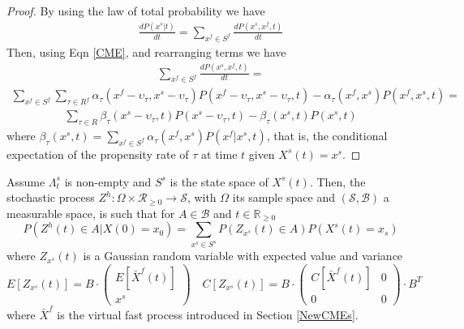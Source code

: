 \documentclass{llncs}
\begin{document}
 \begin{proof}
 By using the law of total probability we have
 \begin{align*}
\frac{d P(x^s|t)}{dt}=\sum_{x^f \in S^f}\frac{d P(x^s,x^f,t)}{dt}
\end{align*}
Then, using Eqn \eqref{CME}, and rearranging terms we have
\begin{align*}
    \sum_{x^f \in S^f}\frac{d P(x^s,x^f,t)}{dt}=
\end{align*}
\begin{align*}
 \sum_{x^f \in S^f}\sum_{\tau \in R^f}\alpha_{\tau}(x^f-\upsilon_{\tau},x^s-\upsilon_{\tau})P(x^f-\upsilon_{\tau},x^s-\upsilon_{\tau},t)- \alpha_{\tau}(x^f,x^s)P(x^f,x^s,t)= 
\end{align*}
\begin{align*}
\sum_{\tau \in R}\beta_{\tau}(x^s-\upsilon_{\tau},t)P(x^s-\upsilon_{\tau},t)- \beta_{\tau}(x^s,t)P(x^s,t)
\end{align*}
where $\beta_{\tau}(x^s,t)= \sum_{x^f \in S^f} \alpha_{\tau}(x^f,x^s)P(x^f|x^s,t)$, that is, the conditional expectation of the propensity rate of $\tau$ at time $t$ given $X^s(t)=x^s$.
 \end{proof}
\begin{theorem}
Assume $\Lambda^s_t$ is non-empty and $S^s$ is the state space of $X^s(t)$.
Then, the stochastic process $Z^h:\Omega \times \mathcal{R}_{\geq 0}\rightarrow \mathcal{S}$, with $\Omega$ its sample space and $(\mathcal{S},\mathcal{B})$ a measurable space, is such that for $A\in \mathcal{B}$ and $t\in \mathbb{R}_{\geq 0}$ 
\begin{equation*}
P(Z^h(t)\in A|X(0)=x_0)=\sum_{x^s \in S^s} P(Z_{x^s}(t)\in A)P(X^s(t)=x_s)
\end{equation*}
where $Z_{x^s}(t)$ is a Gaussian random variable with expected value and variance 
\begin{equation*}
E[Z_{x^s}(t)]=B\cdot
\begin{pmatrix}
E[\bar{X}^f(t)]\\
x^s
\end{pmatrix}
\quad
C[Z_{x^s}(t)]=B\cdot
\begin{pmatrix}
C[\bar{X}^f(t)]&0\\
0&0
\end{pmatrix}
\cdot B^T
\end{equation*}
where $\bar{X}^f$ is the virtual fast process introduced in Section \ref{NewCMEs}.
\end{theorem}
\end{document}
